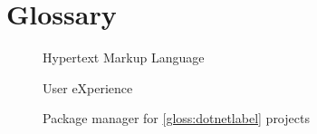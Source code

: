\chapter*{Glossary}

\begin{multicols}{2}
    \raggedright
    \begin{description}
        \item [] Hypertext Markup Language
        \item [] User eXperience
        \item [] Package manager for \ref{gloss:dotnetlabel} projects
    \end{description}
\end{multicols}